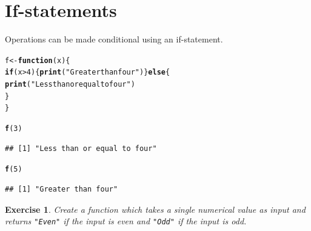 \documentclass{article}\usepackage[]{graphicx}\usepackage[]{color}
\makeatletter
\newcommand{\hlnum}[1]{\textcolor[rgb]{0.686,0.059,0.569}{#1}}%
\newcommand{\hlstr}[1]{\textcolor[rgb]{0.192,0.494,0.8}{#1}}%
\newcommand{\hlopt}[1]{\textcolor[rgb]{0,0,0}{#1}}%
\newcommand{\hlstd}[1]{\textcolor[rgb]{0.345,0.345,0.345}{#1}}%
\newcommand{\hlkwa}[1]{\textcolor[rgb]{0.161,0.373,0.58}{\textbf{#1}}}%
\newcommand{\hlkwb}[1]{\textcolor[rgb]{0.69,0.353,0.396}{#1}}%
\newcommand{\hlkwc}[1]{\textcolor[rgb]{0.333,0.667,0.333}{#1}}%
\newcommand{\hlkwd}[1]{\textcolor[rgb]{0.737,0.353,0.396}{\textbf{#1}}}%
\newenvironment{kframe}{%
 \def\at@end@of@kframe{}%
 \ifinner\ifhmode%
  \def\at@end@of@kframe{\end{minipage}}%
  \begin{minipage}{\columnwidth}%
 \fi\fi%
 \def\FrameCommand##1{\hskip\@totalleftmargin \hskip-\fboxsep
 \colorbox{shadecolor}{##1}\hskip-\fboxsep
     \hskip-\linewidth \hskip-\@totalleftmargin \hskip\columnwidth}%
 \MakeFramed {\advance\hsize-\width
   \@totalleftmargin\z@ \linewidth\hsize
   \@setminipage}}%
 {\par\unskip\endMakeFramed%
 \at@end@of@kframe}
\newenvironment{knitrout}{}{} %
\newtheorem{exercise}{Exercise}[section]
\makeatother
\begin{document}
\section{If-statements}
Operations can be made conditional using an if-statement.
\begin{knitrout}
\color{fgcolor}\begin{kframe}
\begin{alltt}
\hlstd{f} \hlkwb{<-} \hlkwa{function}\hlstd{(}\hlkwc{x}\hlstd{)\{}
  \hlkwa{if}\hlstd{(x} \hlopt{>} \hlnum{4}\hlstd{) \{}\hlkwd{print}\hlstd{(}\hlstr{"Greater than four"}\hlstd{)\}} \hlkwa{else}\hlstd{\{}
    \hlkwd{print}\hlstd{(}\hlstr{"Less than or equal to four"}\hlstd{)}
  \hlstd{\}}
\hlstd{\}}

\hlkwd{f}\hlstd{(}\hlnum{3}\hlstd{)}
\end{alltt}
\begin{verbatim}
## [1] "Less than or equal to four"
\end{verbatim}
\begin{alltt}
\hlkwd{f}\hlstd{(}\hlnum{5}\hlstd{)}
\end{alltt}
\begin{verbatim}
## [1] "Greater than four"
\end{verbatim}
\end{kframe}
\end{knitrout}

\begin{exercise}
Create a function which takes a single numerical value as input and returns \texttt{"Even"} if the input is even and \texttt{"Odd"} if the input is odd.
\end{exercise}
\end{document}
